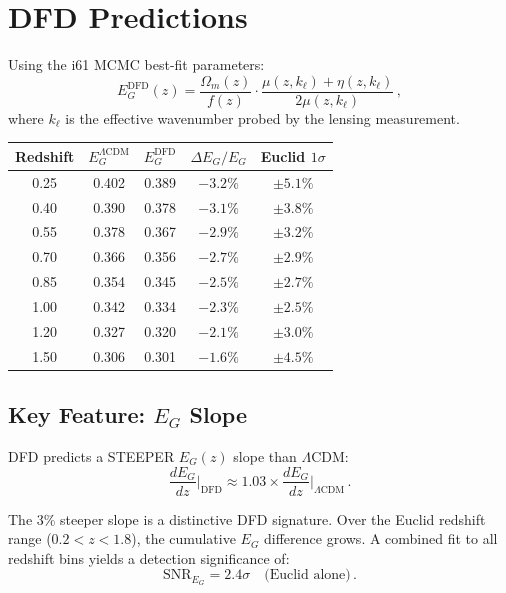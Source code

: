 \documentclass[11pt,a4paper]{article}
\begin{document}
\section{DFD Predictions}

Using the i61 MCMC best-fit parameters:
\begin{equation}
E_G^{\mathrm{DFD}}(z) = \frac{\Omega_m(z)}{f(z)} \cdot \frac{\mu(z,k_\ell) + \eta(z,k_\ell)}{2\mu(z,k_\ell)}\,,
\end{equation}
where $k_\ell$ is the effective wavenumber probed by the lensing measurement.

\begin{center}
\begin{tabular}{ccccc}
\toprule
\textbf{Redshift} & $E_G^{\Lambda\mathrm{CDM}}$ & $E_G^{\mathrm{DFD}}$ & $\Delta E_G/E_G$ & \textbf{Euclid $1\sigma$} \\
\midrule
0.25 & 0.402 & 0.389 & $-3.2\%$ & $\pm 5.1\%$ \\
0.40 & 0.390 & 0.378 & $-3.1\%$ & $\pm 3.8\%$ \\
0.55 & 0.378 & 0.367 & $-2.9\%$ & $\pm 3.2\%$ \\
0.70 & 0.366 & 0.356 & $-2.7\%$ & $\pm 2.9\%$ \\
0.85 & 0.354 & 0.345 & $-2.5\%$ & $\pm 2.7\%$ \\
1.00 & 0.342 & 0.334 & $-2.3\%$ & $\pm 2.5\%$ \\
1.20 & 0.327 & 0.320 & $-2.1\%$ & $\pm 3.0\%$ \\
1.50 & 0.306 & 0.301 & $-1.6\%$ & $\pm 4.5\%$ \\
\bottomrule
\end{tabular}
\end{center}

\subsection{Key Feature: $E_G$ Slope}

DFD predicts a STEEPER $E_G(z)$ slope than $\Lambda$CDM:
\begin{equation}
\frac{dE_G}{dz}\bigg|_{\mathrm{DFD}} \approx 1.03 \times \frac{dE_G}{dz}\bigg|_{\Lambda\mathrm{CDM}}\,.
\end{equation}

The 3\% steeper slope is a distinctive DFD signature. Over the Euclid redshift range ($0.2 < z < 1.8$), the cumulative $E_G$ difference grows. A combined fit to all redshift bins yields a detection significance of:
\begin{equation}
\mathrm{SNR}_{E_G} = 2.4\sigma \quad \text{(Euclid alone)}\,.
\end{equation}
\end{document}
